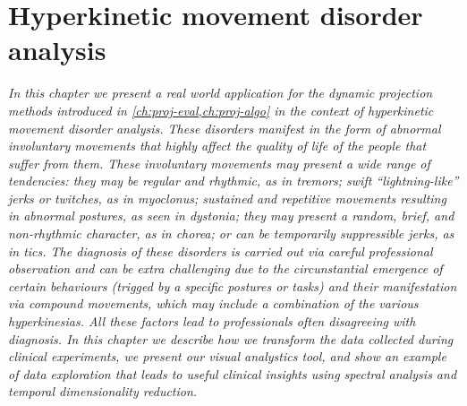 \chapter{Hyperkinetic movement disorder analysis}
\label{ch:nemo}

\textit{
In this chapter we present a real world application for the dynamic projection methods introduced in \cref{ch:proj-eval,ch:proj-algo} in the context of hyperkinetic movement disorder analysis. These disorders manifest in the form of abnormal involuntary movements that highly affect the quality of life of the people that suffer from them. These involuntary movements may present a wide range of tendencies: they may be regular and rhythmic, as in tremors; swift ``lightning-like'' jerks or twitches, as in myoclonus; sustained and repetitive movements resulting in abnormal postures, as seen in dystonia; they may present a random, brief, and non-rhythmic character, as in chorea; or can be temporarily suppressible jerks, as in tics.
The diagnosis of these disorders is carried out via careful professional observation and can be extra challenging due to the circunstantial emergence of certain behaviours (trigged by a specific postures or tasks) and their manifestation via compound movements, which may include a combination of the various hyperkinesias. All these factors lead to professionals often disagreeing with diagnosis. 
In this chapter we describe how we transform the data collected during clinical experiments, we present our visual analystics tool, and show an example of data exploration that leads to useful clinical insights using spectral analysis and temporal dimensionality reduction.
}

\vspace{5mm} %


